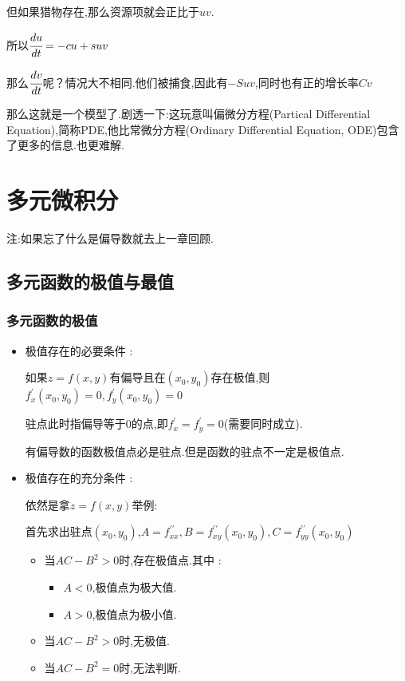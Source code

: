 \documentclass[UTF8,12pt]{ctexbook}
\newcommand{\derivative}{^\prime}
\newcommand{\doubleDerivative}{^{\prime\prime}}
\newcommand{\defFunction}[1]{f(#1)}
\begin{document}
{{{{  但如果猎物存在,那么资源项就会正比于$uv$.

  所以$\cfrac{du}{dt} = -cu + suv$

  那么$\cfrac{dv}{dt}$呢？情况大不相同.他们被捕食,因此有$-Suv$,同时也有正的增长率$Cv$

  那么这就是一个模型了.剧透一下:这玩意叫偏微分方程(Partical Differential Equation),简称PDE,他比常微分方程(Ordinary Differential Equation, ODE)包含了更多的信息.也更难解.

}%

}%

}%

\section{多元微积分}{
注:如果忘了什么是偏导数就去上一章回顾.

\subsection{多元函数的极值与最值}{

  \subsubsection{多元函数的极值}{
    \begin{itemize}
      \item {
            极值存在的必要条件 :

            如果$z = \defFunction{x,y}$有偏导且在$(x_0,y_0)$存在极值,则$f\derivative_x(x_0,y_0) = 0,f\derivative_y(x_0,y_0) = 0$

            驻点此时指偏导等于0的点,即$f\derivative_x = f\derivative_y = 0$(需要同时成立).

            有偏导数的函数极值点必是驻点.但是函数的驻点不一定是极值点.
            }
      \item {
            极值存在的充分条件 :

            依然是拿$z = \defFunction{x,y}$举例:

            首先求出驻点$(x_0,y_0)$,$A = f\doubleDerivative_{xx},B = f\doubleDerivative_{xy}(x_0,y_0),C = f\doubleDerivative_{yy}(x_0,y_0)$

            \begin{itemize}
              \item {当$AC-B^2 > 0$时,存在极值点.其中 :
                    \begin{itemize}
                      \item $A < 0$,极值点为极大值.
                      \item $A > 0$,极值点为极小值.
                    \end{itemize}
                    }
              \item 当$AC - B^2 > 0$时,无极值.
              \item 当$AC - B^2 = 0$时,无法判断.
            \end{itemize}
            }
    \end{itemize}
  }%

}}}
\end{document}

